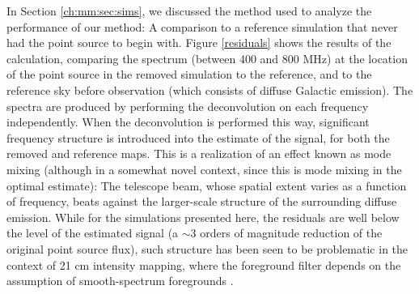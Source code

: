 In Section \ref{ch:mm:sec:sims}, we discussed the method used to analyze the performance of our method: A comparison to a reference simulation that never had the point source to begin with. Figure \ref{residuals} shows the results of the calculation, comparing the spectrum (between 400 and 800 MHz) at the location of the point source in the removed simulation to the reference, and to the reference sky before observation (which consists of diffuse Galactic emission). The spectra are produced by performing the deconvolution on each frequency independently. When the deconvolution is performed this way, significant frequency structure is introduced into the estimate of the signal, for both the removed and reference maps. This is a realization of an effect known as mode mixing (although in a somewhat novel context, since this is mode mixing in the optimal estimate): The telescope beam, whose spatial extent varies as a function of frequency, beats against the larger-scale structure of the surrounding diffuse emission. While for the simulations presented here, the residuals are well below the level of the estimated signal (a $\sim 3$ orders of magnitude reduction of the original point source flux), such structure has been seen to be problematic in the context of 21 cm intensity mapping, where the foreground filter depends on the assumption of smooth-spectrum foregrounds \citep{barry2016}.

